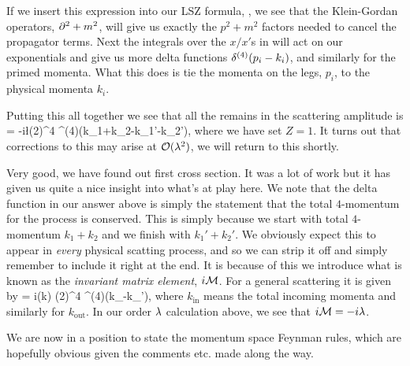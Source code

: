     If we insert this expression into our LSZ formula, , we see that the Klein-Gordan operators, $\partial^2+m^2$, will give us exactly the $p^2+m^2$ factors needed to cancel the propagator terms. Next the integrals over the $x/x'$s in  will act on our exponentials and give us more delta functions $\delta^{(4)}(p_i-k_i)$, and similarly for the primed momenta. What this does is tie the momenta on the legs, $p_i$, to the physical momenta $k_i$.
    
    Putting this all together we see that all the remains in the scattering amplitude is
    \bse 
         = -i\l (2\pi)^4 \del^{(4)}(k_1+k_2-k_1'-k_2'),
    \ese
    where we have set $Z=1$. It turns out that corrections to this may arise at $\mathcal{O}(\lambda^2)$, we will return to this shortly.
\een 

Very good, we have found out first cross section. It was a lot of work but it has given us quite a nice insight into what's at play here. We note that the delta function in our answer above is simply the statement that the total $4$-momentum for the process is conserved. This is simply because we start with total $4$-momentum $k_1+k_2$ and we finish with $k_1'+k_2'$. We obviously expect this to appear in \textit{every} physical scatting process, and so we can strip it off and simply remember to include it right at the end. It is because of this we introduce what is known as the \textit{invariant matrix element}, $i\mathcal{M}$. For a general scattering it is given by
\bse 
     = i\cM(k) (2\pi)^4 \del^{(4)}(k_{}-k_{}'),
\ese
where $k_{\text{in}}$ means the total incoming momenta and similarly for $k_{\text{out}}$. In our order $\lambda$ calculation above, we see that $i\mathcal{M} = -i\lambda$. 

We are now in a position to state the momentum space Feynman rules, which are hopefully obvious given the comments etc. made along the way. 

